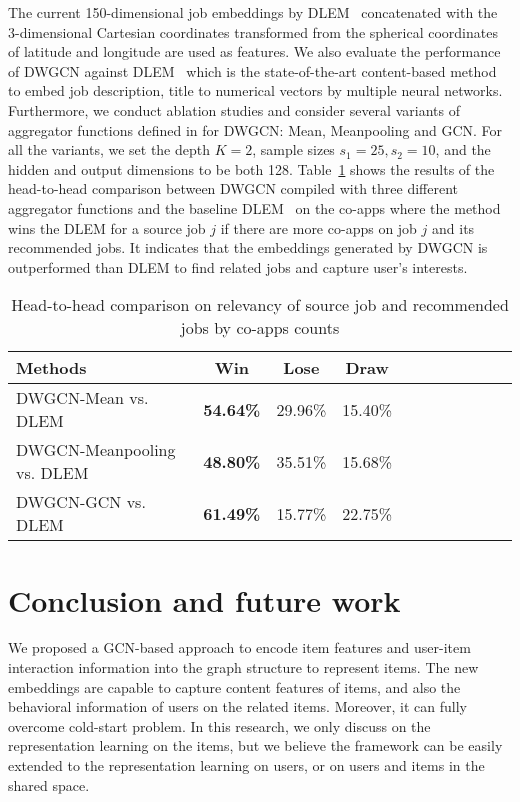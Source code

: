 \documentclass[manuscript,screen,review]{acmart}
\begin{document}
The current 150-dimensional job embeddings by DLEM~\cite{zhao:2021embedding} concatenated with the 3-dimensional Cartesian coordinates transformed from the spherical coordinates of latitude and longitude are used as features. We also evaluate the performance of DWGCN against DLEM~\cite{zhao:2021embedding}  which is the  state-of-the-art content-based method to embed job description, title to numerical vectors by multiple neural networks. Furthermore, we conduct ablation studies and consider several variants of aggregator functions defined in \cite{hamilton2017inductive} for DWGCN: Mean, Meanpooling and GCN. For all the variants, we set the depth $K=2$, sample sizes $s_1=25,s_2=10$, and the hidden and output dimensions to be both 128.
Table~\ref{tab:comp} shows the results of the head-to-head comparison between DWGCN compiled with three different aggregator functions and the baseline DLEM~\cite{zhao:2021embedding} on the co-apps where the method wins the DLEM for a source job $j$ if there are more co-apps on job $j$ and its recommended jobs. It indicates that the embeddings generated by DWGCN is outperformed than DLEM to find related jobs and capture user's interests.  

\begin{table}
  \caption{Head-to-head comparison on relevancy of source job and recommended jobs by co-apps counts}
  \label{tab:comp}
  \begin{tabular}{lcccccccccc}
    \toprule
    Methods & Win & Lose & Draw \\
    \midrule
    DWGCN-Mean vs. DLEM& \textbf{54.64\%} & 29.96\% & 15.40\%\\
    DWGCN-Meanpooling vs. DLEM& \textbf{48.80\%} & 35.51\% & 15.68\%\\
    DWGCN-GCN vs. DLEM & \textbf{61.49\%} & 15.77\% & 22.75\%\\
  \bottomrule
\end{tabular}
\end{table}
 

\section{Conclusion and future work}
We proposed a GCN-based approach to encode item features and user-item interaction information into the graph structure to represent items. The new embeddings are capable to capture content features of items, and also the behavioral information of users on the related items. Moreover, it can fully overcome cold-start problem. In this research, we only discuss on the representation learning on the items, but we believe the framework can be easily extended to the representation learning on users, or on users and items in the shared space. 
\end{document}
